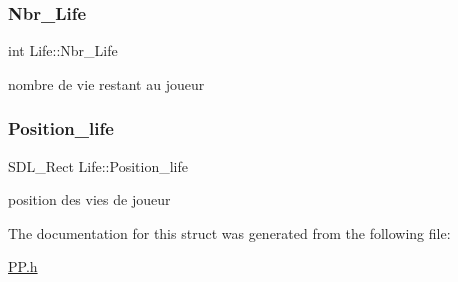 \subsubsection{\texorpdfstring{Nbr\+\_\+\+Life}{Nbr\_Life}}
{\footnotesize\ttfamily int Life\+::\+Nbr\+\_\+\+Life}

nombre de vie restant au joueur \mbox{\label{structLife_ac23b346f3b87e8259cd5766521ee3f01}} 
\subsubsection{\texorpdfstring{Position\+\_\+life}{Position\_life}}
{\footnotesize\ttfamily S\+D\+L\+\_\+\+Rect Life\+::\+Position\+\_\+life}

position des vies de joueur 

The documentation for this struct was generated from the following file\+:\begin{DoxyCompactItemize}
\item 
\hyperlink{PP_8h}{P\+P.\+h}\end{DoxyCompactItemize}
